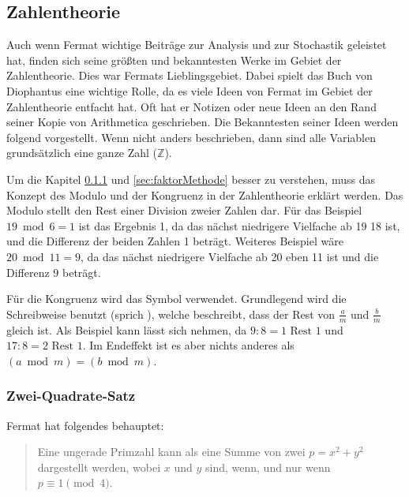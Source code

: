 \subsection{Zahlentheorie} \label{sec:zahlentheorie}
Auch wenn Fermat wichtige Beiträge zur Analysis und zur Stochastik geleistet hat, finden sich seine größten und bekanntesten Werke im Gebiet der \Gls{Zahlentheorie}. Dies war Fermats Lieblingsgebiet. Dabei spielt das Buch \textit{} von Diophantus eine wichtige Rolle, da es viele Ideen von Fermat im Gebiet der \Gls{Zahlentheorie} entfacht hat. Oft hat er Notizen oder neue Ideen an den Rand seiner Kopie von Arithmetica geschrieben. Die Bekanntesten seiner Ideen werden folgend vorgestellt. Wenn nicht anders beschrieben, dann sind alle Variablen grundsätzlich eine ganze Zahl ($\mathbb{Z}$).

Um die Kapitel \ref{sec:2sqr} und \ref{sec:faktorMethode} besser zu verstehen, muss das Konzept des \Gls{Modulo} und der \Gls{Kongruenz} in der \Gls{Zahlentheorie} erklärt werden. Das \Gls{Modulo} stellt den Rest einer Division zweier Zahlen dar. Für das Beispiel $19 \bmod 6 = 1$ ist das Ergebnis 1, da das nächst niedrigere Vielfache ab 19 18 ist, und die Differenz der beiden Zahlen 1 beträgt. Weiteres Beispiel wäre $20 \bmod 11 = 9$, da das nächst niedrigere Vielfache ab 20 eben 11 ist und die Differenz 9 beträgt.

Für die \Gls{Kongruenz} wird das Symbol  verwendet. Grundlegend wird die Schreibweise  benutzt (sprich ), welche beschreibt, dass der Rest von $\frac{a}{m}$ und $\frac{b}{m}$ gleich ist. Als Beispiel kann lässt sich  nehmen, da $9 : 8 = 1 \text{ Rest } 1$ und $17 : 8 = 2 \text{ Rest } 1$. Im Endeffekt ist es aber nichts anderes als $(a \bmod m) = (b \bmod m)$.

\subsubsection{Zwei-Quadrate-Satz} \label{sec:2sqr}
Fermat hat folgendes behauptet:

\begin{quote}
    Eine ungerade \Gls{Primzahl} kann als eine Summe von zwei  $p = x^2 + y^2$ dargestellt werden, wobei $x$ und $y$  sind, wenn, und nur wenn $p \equiv 1 \pmod{4}$.
\end{quote}

